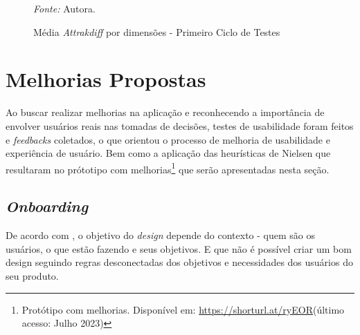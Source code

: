 \begin{figure}[h!]
	\centering
	\caption{Média \textit{Attrakdiff} por dimensões - Primeiro Ciclo de Testes}
	\begin{tablenotes}[flushleft]
		\centering
		\item \textit{Fonte:} Autora.
	\end{tablenotes}
	\label{fig21}
\end{figure}

\section{Melhorias Propostas}
\label{sec:Melhorias Propostas}
Ao buscar realizar melhorias na aplicação e reconhecendo a importância de envolver usuários reais nas tomadas de decisões, testes de usabilidade foram feitos e \textit{feedbacks} coletados, 
o que orientou o processo de melhoria de usabilidade e experiência de usuário. Bem como a aplicação das heurísticas de Nielsen que resultaram no prótotipo com melhorias\footnote{Protótipo 
com melhorias. Disponível em: \url{https://shorturl.at/ryEOR}(último acesso: Julho 2023)} que serão apresentadas nesta seção.

\subsection{\textit{Onboarding}}
\label{sec:Onboarding}
De acordo com , o objetivo do \textit{design} depende do contexto - quem são os usuários, o que estão fazendo e seus objetivos. E que não é possível criar um bom design 
seguindo regras desconectadas dos objetivos e necessidades dos usuários do seu produto. 

